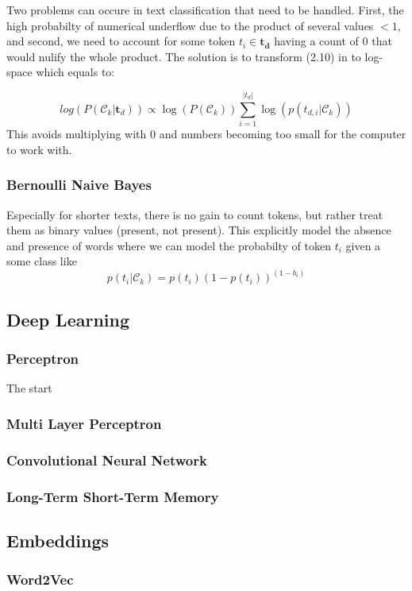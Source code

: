 Two problems can occure in text classification that need to be handled. First, the high probabilty of numerical underflow due to the product of several values $<1$, and second, we need to account for some token $t_i \in \boldsymbol{t_d}$ having a count of $0$ that would nulify the whole product. The solution is to transform (2.10) in to log-space which equals to:

$$log(P(\mathcal{C}_k|\boldsymbol{t}_d)) \propto \log(P(\mathcal{C}_k)) \sum_{i=1}^{|t_{d}|} \log({p(t_{d,i}|\mathcal{C}_k)})$$
This avoids multiplying with $0$ and numbers becoming too small for the computer to work with.

\subsubsection{Bernoulli Naive Bayes}
Especially for shorter texts, there is no gain to count tokens, but rather treat them as binary values (present, not present). This explicitly model the absence and presence of words where we can model the probabilty of token $t_i$ given a some class like
\[p(t_{i}|\mathcal{C}_k) = p(t_{i})(1-p(t_{i}))^{(1-b_{i})}\]

\subsection{Deep Learning}
\subsubsection{Perceptron}
The start
\subsubsection{Multi Layer Perceptron}

\subsubsection{Convolutional Neural Network}
\subsubsection{Long-Term Short-Term Memory}


\subsection{Embeddings}
\subsubsection{Word2Vec}
